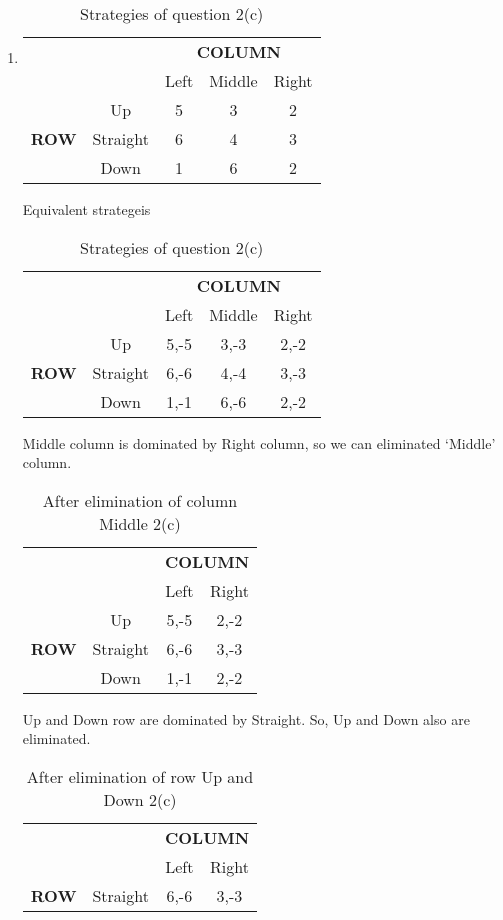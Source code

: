 \documentclass[a4paper,12pt]{article}
\begin{document}
\begin{enumerate}
\begin{enumerate}
\item%
\begin{table}[H]
\centering
\begin{tabular}{@{}ccccc@{}}
\toprule
& & \multicolumn{3}{c}{\bfseries COLUMN}\\
& & Left & Middle & Right\\
\multirow{3}{*}{\bfseries ROW} & Up & 5 & 3 & 2\\
 & Straight & 6 & 4 & 3\\
 & Down & 1 & 6 & 2\\
\bottomrule
\end{tabular}
\caption{Strategies of question 2(c)}
\end{table}
Equivalent strategeis
\begin{table}[H]
\centering
\begin{tabular}{@{}ccccc@{}}
\toprule
& & \multicolumn{3}{c}{\bfseries COLUMN}\\
& & Left & Middle & Right\\
\multirow{3}{*}{\bfseries ROW} & Up & 5,-5 & 3,-3 & 2,-2\\
 & Straight & 6,-6 & 4,-4 & 3,-3\\
 & Down & 1,-1 & 6,-6 & 2,-2\\
\bottomrule
\end{tabular}
\caption{Strategies of question 2(c)}
\end{table}

Middle column is dominated by Right column, so we can eliminated `Middle' column.

\begin{table}[H]
\centering
\begin{tabular}{@{}cccc@{}}
\toprule
& & \multicolumn{2}{c}{\bfseries COLUMN}\\
& & Left & Right\\
\multirow{3}{*}{\bfseries ROW} & Up & 5,-5 & 2,-2\\
 & Straight & 6,-6 & 3,-3\\
 & Down & 1,-1 & 2,-2\\
\bottomrule
\end{tabular}
\caption{After elimination of column Middle 2(c)}
\end{table}

Up and Down row are dominated by Straight. So, Up and Down also are eliminated.

\begin{table}[H]
\centering
\begin{tabular}{@{}cccc@{}}
\toprule
& & \multicolumn{2}{c}{\bfseries COLUMN}\\
& & Left & Right\\
{\bfseries ROW} & Straight & 6,-6 & 3,-3\\
\bottomrule
\end{tabular}
\caption{After elimination of row Up and Down 2(c)}
\end{table}


\end{enumerate}
\end{enumerate}
\end{document}
